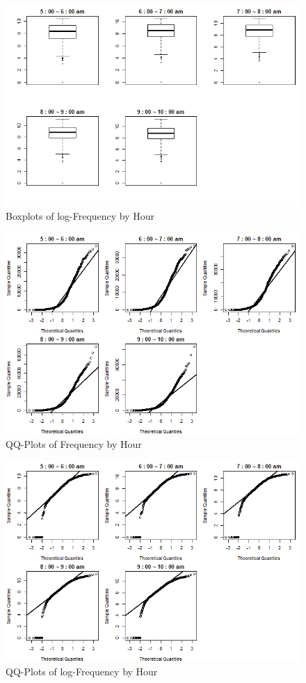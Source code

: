 \documentclass[hidelinks,12pt]{article}
\begin{document}
	\begin{figure}[!ht]
		\includegraphics[width=\textwidth]{box_log.png}
		\caption{Boxplots of log-Frequency by Hour \label{fig:lgboxplot}}
	\end{figure}
\FloatBarrier
	\begin{figure}[!ht]
		\includegraphics[width=\textwidth]{qq.png}
		\caption{QQ-Plots of Frequency by Hour \label{fig:qq}}
	\end{figure}
\FloatBarrier
	\begin{figure}[!ht]
		\includegraphics[width=\textwidth]{qq_log.png}
		\caption{QQ-Plots of log-Frequency by Hour \label{fig:lgqq}}
	\end{figure}
\end{document}
